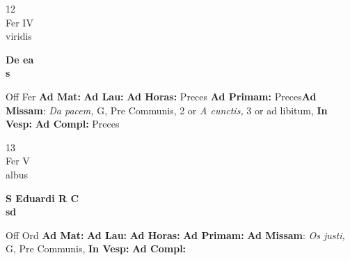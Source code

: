 \documentclass[10pt, openany]{book}
\begin{document}
    \begin{center}
        \begin{minipage}{3.5in}
            \vspace{2em}
            \begin{minipage}{0.5in}
                {\Huge 12} \\
                {\normalsize Fer IV} \\
                {\normalsize viridis}
            \end{minipage}
            \begin{minipage}{3.0in}
                \textbf{ \large De ea \\
                \textnormal{\normalsize s}} \\ 
            \end{minipage}
            \begin{justify}Off Fer
                \textbf{Ad Mat: }
                \textbf{Ad Lau: }
                \textbf{Ad Horas: }Preces
                \textbf{Ad Primam: }Preces\textbf{Ad Missam}: \textit{Da pacem,} G, Pre Communis, 2 or \textit{A cunctis,} 3 or ad libitum,  
                \textbf{In Vesp: }
                \textbf{Ad Compl: }Preces
            \end{justify}
        \end{minipage}
    \end{center}

    \begin{center}
        \begin{minipage}{3.5in}
            \vspace{2em}
            \begin{minipage}{0.5in}
                {\Huge 13} \\
                {\normalsize Fer V} \\
                {\normalsize albus}
            \end{minipage}
            \begin{minipage}{3.0in}
                \textbf{ \large S Eduardi R C \\
                \textnormal{\normalsize sd}} \\ 
            \end{minipage}
            \begin{justify}Off Ord
                \textbf{Ad Mat: }
                \textbf{Ad Lau: }
                \textbf{Ad Horas: }
                \textbf{Ad Primam: }\textbf{Ad Missam}: \textit{Os justi,} G, Pre Communis,  
                \textbf{In Vesp: }
                \textbf{Ad Compl: }
            \end{justify}
        \end{minipage}
    \end{center}
\end{document}
